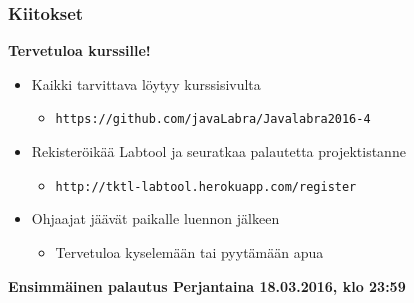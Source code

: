 \documentclass[finnish]{beamer}
\begin{document}
	\begin{frame}
		\frametitle{Kiitokset}

		{\LARGE \textbf{Tervetuloa kurssille!}}
		\begin{itemize}
			\item Kaikki tarvittava löytyy kurssisivulta
			\begin{itemize}
				\item \texttt{https://github.com/javaLabra/Javalabra2016-4}
			\end{itemize}
			\item Rekisteröikää Labtool ja seuratkaa palautetta projektistanne
			\begin{itemize}
				\item \texttt{http://tktl-labtool.herokuapp.com/register}
			\end{itemize}
			\item Ohjaajat jäävät paikalle luennon jälkeen
			\begin{itemize}
				\item Tervetuloa kyselemään tai pyytämään apua 
			\end{itemize}
		\end{itemize}
		\textbf{Ensimmäinen palautus Perjantaina 18.03.2016, klo 23:59}
		
	\end{frame}
	
\end{document}
